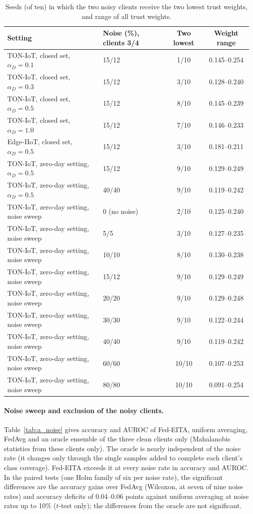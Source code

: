 \documentclass[pdflatex,sn-mathphys-num]{sn-jnl}
\begin{document}
{{{{{{\begin{table}[!htbp]\centering
\caption{Seeds (of ten) in which the two noisy clients receive the two lowest trust weights, and range of all trust weights.}\label{tab:a_detect}
\scriptsize
\setlength{\tabcolsep}{4pt}
\begin{tabular}{llcc}\toprule
Setting & Noise (\%), clients 3/4 & Two lowest & Weight range \\ \midrule
TON-IoT, closed set, $\alpha_D=0.1$ & 15/12 & 1/10 & 0.145--0.254 \\
TON-IoT, closed set, $\alpha_D=0.3$ & 15/12 & 3/10 & 0.128--0.240 \\
TON-IoT, closed set, $\alpha_D=0.5$ & 15/12 & 8/10 & 0.145--0.239 \\
TON-IoT, closed set, $\alpha_D=1.0$ & 15/12 & 7/10 & 0.146--0.233 \\
Edge-IIoT, closed set, $\alpha_D=0.5$ & 15/12 & 3/10 & 0.181--0.211 \\
TON-IoT, zero-day setting, $\alpha_D=0.5$ & 15/12 & 9/10 & 0.129--0.249 \\
TON-IoT, zero-day setting, $\alpha_D=0.5$ & 40/40 & 9/10 & 0.119--0.242 \\
TON-IoT, zero-day setting, noise sweep & 0 (no noise) & 2/10 & 0.125--0.240 \\
TON-IoT, zero-day setting, noise sweep & 5/5 & 3/10 & 0.127--0.235 \\
TON-IoT, zero-day setting, noise sweep & 10/10 & 8/10 & 0.130--0.238 \\
TON-IoT, zero-day setting, noise sweep & 15/12 & 9/10 & 0.129--0.249 \\
TON-IoT, zero-day setting, noise sweep & 20/20 & 9/10 & 0.129--0.248 \\
TON-IoT, zero-day setting, noise sweep & 30/30 & 9/10 & 0.122--0.244 \\
TON-IoT, zero-day setting, noise sweep & 40/40 & 9/10 & 0.119--0.242 \\
TON-IoT, zero-day setting, noise sweep & 60/60 & 10/10 & 0.107--0.253 \\
TON-IoT, zero-day setting, noise sweep & 80/80 & 10/10 & 0.091--0.254 \\
\bottomrule\end{tabular}
\end{table}

\paragraph{Noise sweep and exclusion of the noisy clients.} Table~\ref{tab:a_noise} gives accuracy and AUROC of Fed-EITA, uniform averaging, FedAvg and an oracle ensemble of the three clean clients only (Mahalanobis statistics from these clients only). The oracle is nearly independent of the noise rate (it changes only through the single samples added to complete each client's class coverage). Fed-EITA exceeds it at every noise rate in accuracy and AUROC. In the paired tests (one Holm family of six per noise rate), the significant differences are the accuracy gains over FedAvg (Wilcoxon, at seven of nine noise rates) and accuracy deficits of 0.04--0.06 points against uniform averaging at noise rates up to 10\% ($t$-test only); the differences from the oracle are not significant.

}}}}}}
\end{document}
